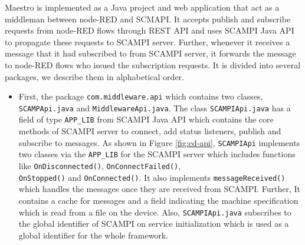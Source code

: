 Maestro is implemented as a Java project and web application that act as a middleman between node-RED and SCMAPI. It accepts publish and subscribe requests from node-RED flows through REST API and uses  SCAMPI Java API to propagate these requests to SCAMPI server. Further, whenever it receives a message that it had subscribed to from SCAMPI server, it forwards the message to  node-RED flows who issued the subscription requests. It is divided into several packages, we describe them in alphabetical order.
 \begin{itemize}
 
  \item First, the package \verb|com.middleware.api| which contains two classes, \verb|SCAMPApi.java|  and \verb|MiddlewareApi.java|. The class \verb|SCAMPIApi.java| has a field of type \verb|APP_LIB| from SCAMPI Java API which contains the core methods of SCAMPI server to connect, add status listeners, publish and subscribe to messages.  As shown in Figure \ref{fig:cd-api}, \verb|SCAMPIApi| implements two classes via the \verb|APP_LIB| for the SCAMPI server which includes functions like \verb|OnDisconnected()|, \verb|OnConnectFailed()|,\\  \verb|OnStopped()| and  \verb|OnConnected()|. It also implements \verb|messageReceived()| which handles the messages once they are received from SCAMPI. Further, It contains a cache for messages and a field indicating the machine specification which is read from a file on the device. Also, \verb|SCAMPIApi.java| subscribes to the global identifier of SCAMPI on service initialization which is used as a global identifier for the whole framework. 
 

\end{itemize}
